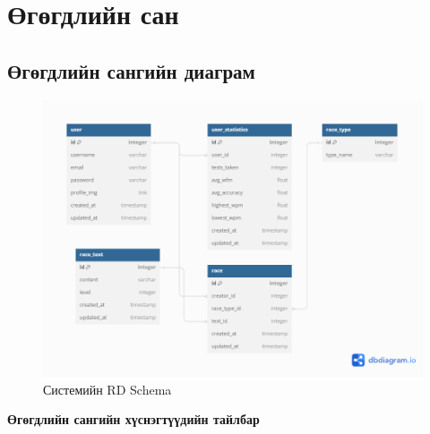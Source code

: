 


\clearpage
\section{Өгөгдлийн сан}

\subsection{Өгөгдлийн сангийн диаграм}
\begin{figure}[h]
	\centering
	\includegraphics[width=15cm]{images/rd_schema.png}
	\caption{Системийн RD Schema}
	\label{fig:erd}
\end{figure}

\textbf{Өгөгдлийн сангийн хүснэгтүүдийн тайлбар}

